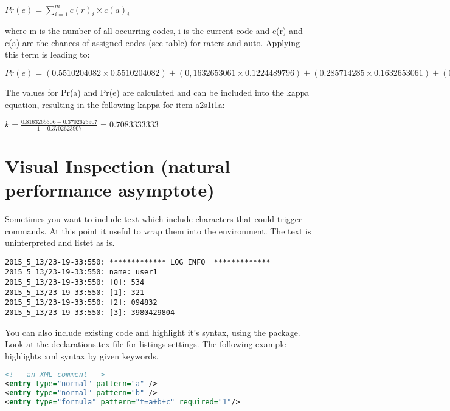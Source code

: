 \begin{center}
$Pr(e) = \displaystyle\sum_{i=1}^{m} c(r)_i \times c(a)_i $
\end{center}

where m is the number of all occurring codes, i is the current code and c(r) and c(a) are the chances of assigned codes (see table) for raters and auto. Applying this term is leading to:


\begin{center}
$Pr(e) =  (0.5510204082 \times 0.5510204082) + (0,1632653061 \times 0.1224489796) + (0.285714285 \times 0.1632653061) + (0 \times 0) = 0.3702623907$
\end{center}

The values for Pr(a) and Pr(e) are calculated and can be included into the kappa equation, resulting in the following kappa for item a2s1i1a:

\begin{center}
 $k=\frac{0.8163265306 -0.3702623907}{1 - 0.3702623907} = 0.7083333333$
\end{center}


\section{Visual Inspection (natural performance asymptote)}

Sometimes you want to include text which include characters that could trigger commands. At this point it useful to wrap them into the  environment. The text is uninterpreted and listet as is.

\scriptsize
\begin{verbatim}
2015_5_13/23-19-33:550: ************* LOG INFO  *************
2015_5_13/23-19-33:550: name: user1
2015_5_13/23-19-33:550: [0]: 534
2015_5_13/23-19-33:550: [1]: 321
2015_5_13/23-19-33:550: [2]: 094832
2015_5_13/23-19-33:550: [3]: 3980429804
\end{verbatim}
\normalsize	


You can also include existing code and highlight it's syntax, using the  package. Look at the declarations.tex file for listings settings. The following example highlights xml syntax by given keywords.

\small
\begin{lstlisting}[keywordstyle=\color{blue},language=XML]
<!-- an XML comment -->
<entry type="normal" pattern="a" />
<entry type="normal" pattern="b" />
<entry type="formula" pattern="t=a+b+c" required="1"/>
\end{lstlisting}
\normalsize	

